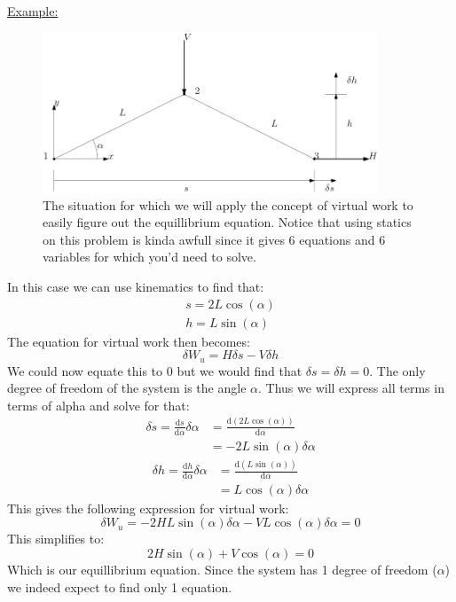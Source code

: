 \documentclass[11pt, a4paper]{article}
\renewcommand*{\d}{\text{d}}
\numberwithin{equation}{section}
\numberwithin{figure}{section}
\begin{document}
\underline{Example:}
\begin{figure}[H]
  \centerline{\includegraphics[width=100mm]{images/1.png}}
  \caption{The situation for which we will apply the concept of virtual work to easily figure out the equillibrium equation. Notice that using statics on this problem is kinda awfull since it gives 6 equations and 6 variables for which you'd need to solve.}
\end{figure}
In this case we can use kinematics to find that:
\begin{gather*}
  s = 2L\cos(\alpha)\\
  h = L\sin(\alpha)
\end{gather*}
The equation for virtual work then becomes:
\begin{equation*}
  \delta W_u = H\delta s - V\delta h
\end{equation*}
We could now equate this to $0$ but we would find that $\delta s = \delta h = 0$. The only degree of freedom of the system is the angle $\alpha$. Thus we will express all terms in terms of alpha and solve for that:
\begin{align*}
  \delta s = \frac{\d s}{\d \alpha} \delta\alpha &= \frac{\d(2L\cos(\alpha))}{\d\alpha}\\
  &=-2L\sin(\alpha)\delta\alpha
\end{align*}
\begin{align*}
  \delta h = \frac{\d h}{\d \alpha} \delta\alpha &= \frac{\d(L\sin(\alpha))}{\d\alpha}\\
  &=L\cos(\alpha)\delta\alpha
\end{align*}
This gives the following expression for virtual work:
\begin{equation*}
  \delta W_u = -2HL\sin(\alpha)\delta\alpha - VL\cos(\alpha)\delta\alpha = 0
\end{equation*}
This simplifies to:
\begin{equation*}
  2H\sin(\alpha) + V\cos(\alpha) = 0
\end{equation*}
Which is our equillibrium equation. Since the system has 1 degree of freedom ($\alpha$) we indeed expect to find only 1 equation.
\end{document}

